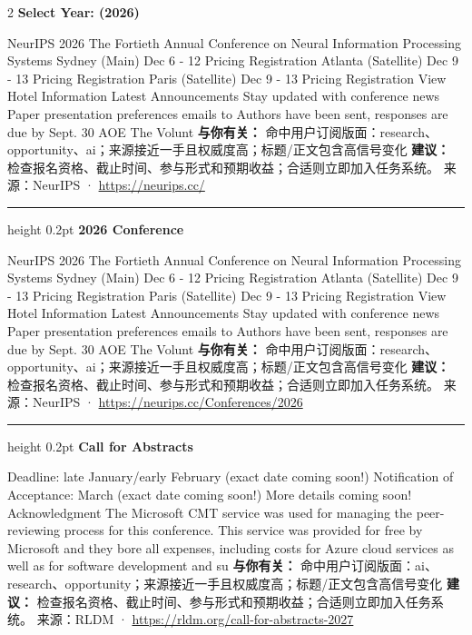 \documentclass[10.5pt]{ctexart}
\begin{document}
\begin{multicols}{2}
{\large\bfseries Select Year: (2026)}\par
NeurIPS 2026 The Fortieth Annual Conference on Neural Information Processing Systems Sydney (Main) Dec 6 - 12 Pricing Registration Atlanta (Satellite) Dec 9 - 13 Pricing Registration Paris (Satellite) Dec 9 - 13 Pricing Registration View Hotel Information Latest Announcements Stay updated with conference news Paper presentation preferences emails to Authors have been sent, responses are due by Sept. 30 AOE The Volunt
\textbf{与你有关：} 命中用户订阅版面：research、opportunity、ai；来源接近一手且权威度高；标题/正文包含高信号变化
\textbf{建议：} 检查报名资格、截止时间、参与形式和预期收益；合适则立即加入任务系统。
{\footnotesize\color{ormuted} 来源：NeurIPS · \url{https://neurips.cc/}}
\vspace{2mm}
\hrule height 0.2pt
\vspace{2mm}
{\large\bfseries 2026 Conference}\par
NeurIPS 2026 The Fortieth Annual Conference on Neural Information Processing Systems Sydney (Main) Dec 6 - 12 Pricing Registration Atlanta (Satellite) Dec 9 - 13 Pricing Registration Paris (Satellite) Dec 9 - 13 Pricing Registration View Hotel Information Latest Announcements Stay updated with conference news Paper presentation preferences emails to Authors have been sent, responses are due by Sept. 30 AOE The Volunt
\textbf{与你有关：} 命中用户订阅版面：research、opportunity、ai；来源接近一手且权威度高；标题/正文包含高信号变化
\textbf{建议：} 检查报名资格、截止时间、参与形式和预期收益；合适则立即加入任务系统。
{\footnotesize\color{ormuted} 来源：NeurIPS · \url{https://neurips.cc/Conferences/2026}}
\vspace{2mm}
\hrule height 0.2pt
\vspace{2mm}
{\large\bfseries Call for Abstracts}\par
Deadline: late January/early February (exact date coming soon!) Notification of Acceptance: March (exact date coming soon!) More details coming soon! Acknowledgment The Microsoft CMT service was used for managing the peer-reviewing process for this conference. This service was provided for free by Microsoft and they bore all expenses, including costs for Azure cloud services as well as for software development and su
\textbf{与你有关：} 命中用户订阅版面：ai、research、opportunity；来源接近一手且权威度高；标题/正文包含高信号变化
\textbf{建议：} 检查报名资格、截止时间、参与形式和预期收益；合适则立即加入任务系统。
{\footnotesize\color{ormuted} 来源：RLDM · \url{https://rldm.org/call-for-abstracts-2027}}

\end{multicols}
\end{document}
